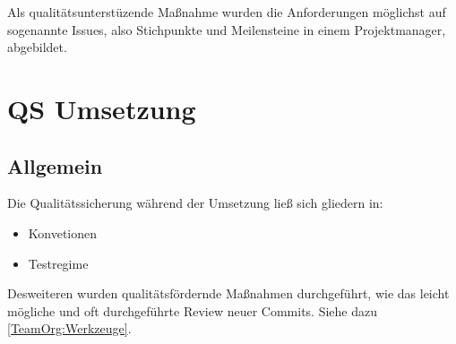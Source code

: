 Als qualitätsunterstüzende Maßnahme wurden die Anforderungen möglichst auf sogenannte Issues, also Stichpunkte und Meilensteine in einem Projektmanager, abgebildet.
\section{QS Umsetzung}
\subsection{Allgemein}
Die Qualitätssicherung während der Umsetzung ließ sich gliedern in:
\begin{itemize}
\item Konvetionen
\item Testregime
\end{itemize}
Desweiteren wurden qualitätsfördernde Maßnahmen durchgeführt, wie das leicht mögliche und oft durchgeführte Review neuer Commits. Siehe dazu \ref{TeamOrg:Werkzeuge}.

